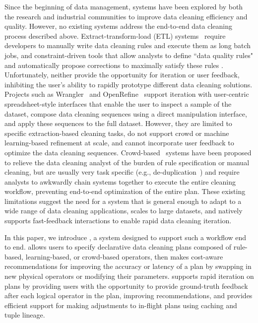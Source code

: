 Since the beginning of data management, systems have been explored by both the research and industrial communities to improve data cleaning efficiency and quality.
However, no existing systems address the end-to-end data cleaning process described above.
Extract-transform-load (ETL) systems~\cite{informatica,talend,apachefalcon} require developers to manually write data cleaning rules and execute them as long batch jobs, 
and constraint-driven tools that allow analysts to define ``data quality rules" and automatically propose corrections to maximally satisfy these rules \cite{DBLP:conf/sigmod/DallachiesaEEEIOT13}.
Unfortunately, neither provide the opportunity for iteration or user feedback, inhibiting the user's ability to rapidly prototype different data cleaning solutions.
Projects such as Wrangler~\cite{wrangler,trifacta} and OpenRefine~\cite{openrefine} support iteration with user-centric spreadsheet-style interfaces that enable the user to inspect a sample of the dataset, compose data cleaning sequences using a direct manipulation interface, and apply these sequences to the full dataset.
However, they are limited to specific extraction-based cleaning tasks, do not support crowd or machine learning-based refinement at scale, and cannot incorporate user feedback to optimize the data cleaning sequences.
Crowd-based~\cite{gokhale2014corleone,stonebraker2013data} systems have been proposed to relieve the data cleaning analyst of the burden of rule specification or manual cleaning, but are usually very task specific (e.g., de-duplication~\cite{gokhale2014corleone,park2014crowdfill,eracer,chen2014integrating}) and require analysts to awkwardly chain systems together to execute the entire cleaning workflow, preventing end-to-end optimization of the entire plan.
These existing limitations suggest the need for a system that is general enough to adapt to a wide range of data cleaning applications, scales to large datasets, and natively supports fast-feedback interactions to enable rapid data cleaning iteration.

In this paper, we introduce \sys, a system designed to support such a workflow end to end.
\sys allows users to specify declarative data cleaning plans composed of rule-based, learning-based, or crowd-based operators, then makes cost-aware recommendations for improving the accuracy or latency of a plan by swapping in new physical operators or modifying their parameters.
\sys supports rapid iteration on plans by providing users with the opportunity to provide ground-truth feedback after each logical operator in the plan, improving recommendations, and provides efficient support for making adjustments to in-flight plans using caching and tuple lineage.

